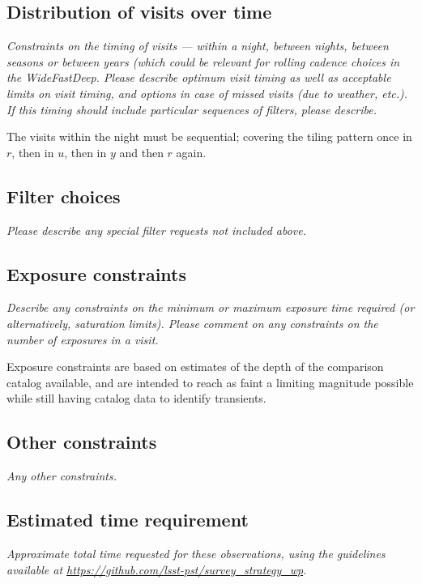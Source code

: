 \documentclass[11pt]{article}
\begin{document}
\subsection{Distribution of visits over time}
\begin{footnotesize}{\it Constraints on the timing of visits --- within a night, between nights, between seasons or
between years (which could be relevant for rolling cadence choices in the WideFastDeep. 
Please describe optimum visit timing as well as acceptable limits on visit timing, and options in
case of missed visits (due to weather, etc.). If this timing should include particular sequences
of filters, please describe.}
\end{footnotesize}

The visits within the night must be sequential; covering the tiling pattern once in $r$, then in $u$, then in $y$ and then $r$ again.

\subsection{Filter choices}
\begin{footnotesize}
{\it Please describe any special filter requests not included above.}
\end{footnotesize}

\subsection{Exposure constraints}
\begin{footnotesize}
{\it Describe any constraints on the minimum or maximum exposure time required (or alternatively, saturation limits).
Please comment on any constraints on the number of exposures in a visit.}
\end{footnotesize}

Exposure constraints are based on estimates of the depth of the comparison catalog available, and are intended to
reach as faint a limiting magnitude possible while still having catalog data to identify transients.

\subsection{Other constraints}
\begin{footnotesize}
{\it Any other constraints.}
\end{footnotesize}

\subsection{Estimated time requirement}
\begin{footnotesize}
{\it Approximate total time requested for these observations, using the guidelines available at \url{https://github.com/lsst-pst/survey_strategy_wp}.}
\end{footnotesize}
\end{document}
